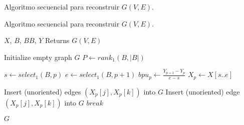 \begin{algorithm}[H]
\caption{Algoritmo secuencial para reconstruir $G(V, E)$.}
\caption{Algoritmo secuencial para reconstruir $G(V, E)$.}
\label{alg:sequential}
\begin{algorithmic}[1]
    \REQUIRE $X$, $B$, $BB$, $Y$
    \ENSURE Returns $G(V, E)$

    \STATE Initialize empty graph $G$
    \STATE $P \leftarrow rank_{1}(B,|B|)$

    	\STATE $s \leftarrow select_{1}(B, p)$
    	\STATE $e \leftarrow select_{1}(B, p + 1)$
        \STATE $bpu_{p} \leftarrow \frac{Y_{p + 1} - Y_{p}}{e - s}$
        \STATE $X_{p} \leftarrow X[s..e]$

            
                		\STATE Insert (unoriented) edges $(X_{p}[j], X_{p}[k])$ into $G$
                	\ELSE
                        		\STATE Insert (unoriented) edge $(X_{p}[j], X_{p}[k])$ into $G$
                        		\STATE $break$
                    		\ENDIF
                		\ENDFOR
                	\ENDIF
                	
            \ENDFOR
        \ENDFOR
       
   	\ENDFOR 
    \RETURN $G$
\end{algorithmic}
\end{algorithm}
